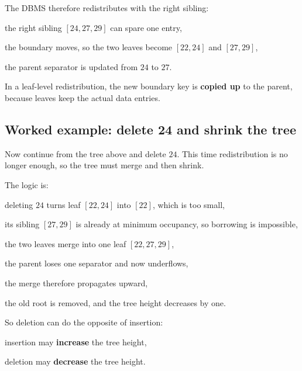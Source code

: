 \documentclass[../../dis.tex]{subfiles}
\begin{document}
The DBMS therefore redistributes with the right sibling:
\begin{dashlist}
    \item the right sibling \([24,27,29]\) can spare one entry,
    \item the boundary moves, so the two leaves become \([22,24]\) and \([27,29]\),
    \item the parent separator is updated from \(24\) to \(27\).
\end{dashlist}

In a leaf-level redistribution, the new boundary key is \textbf{copied up} to the parent, because leaves keep the actual data entries.

\subsection{Worked example: delete 24 and shrink the tree}
Now continue from the tree above and delete \(24\). This time redistribution is no longer enough, so the tree must merge and then shrink.

\begin{schema}
{\resizebox{0.98\textwidth}{!}{}}\par}
\end{schema}

The logic is:
\begin{dashlist}
    \item deleting \(24\) turns leaf \([22,24]\) into \([22]\), which is too small,
    \item its sibling \([27,29]\) is already at minimum occupancy, so borrowing is impossible,
    \item the two leaves merge into one leaf \([22,27,29]\),
    \item the parent loses one separator and now underflows,
    \item the merge therefore propagates upward,
    \item the old root is removed, and the tree height decreases by one.
\end{dashlist}

So deletion can do the opposite of insertion:
\begin{dashlist}
    \item insertion may \textbf{increase} the tree height,
    \item deletion may \textbf{decrease} the tree height.
\end{dashlist}
\end{document}

